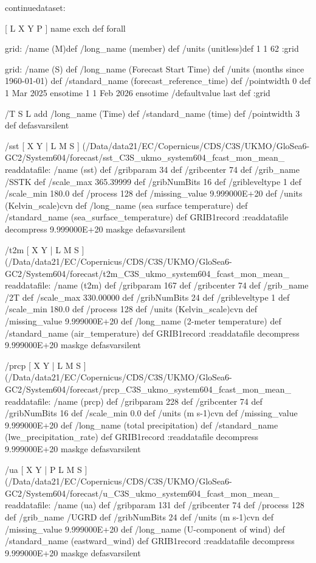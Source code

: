 \begin{ingrid}

continuedataset:

[ L X Y P ] { name exch def } forall

grid:
/name (M)def
/long_name (member) def
/units (unitless)def
1 1 62
:grid

grid:
/name (S) def
/long_name (Forecast Start Time) def
/units (months since 1960-01-01) def
/standard_name (forecast_reference_time) def
/pointwidth 0 def
1 Mar 2025 ensotime
1
1 Feb 2026 ensotime
/defaultvalue { last } def
:grid

/T { S L add
/long_name (Time) def
/standard_name (time) def 
/pointwidth 3 def
} defasvarsilent

/sst { [ X Y | L M S ] (/Data/data21/EC/Copernicus/CDS/C3S/UKMO/GloSea6-GC2/System604/forecast/sst_C3S_ukmo_system604_fcast_mon_mean_%
 readdatafile:
 /name (sst) def
 /gribparam 34 def
 /gribcenter 74 def
 /grib_name /SSTK def
 /scale_max 365.39999 def
 /gribNumBits 16 def
 /gribleveltype 1 def
 /scale_min 180.0 def
 /process 128 def
 /missing_value 9.999000E+20 def
 /units (Kelvin_scale)cvn def
 /long_name (sea surface temperature) def
 /standard_name (sea_surface_temperature) def
 GRIB1record :readdatafile
 decompress
 9.999000E+20 maskge
}defasvarsilent

/t2m { [ X Y | L M S ] (/Data/data21/EC/Copernicus/CDS/C3S/UKMO/GloSea6-GC2/System604/forecast/t2m_C3S_ukmo_system604_fcast_mon_mean_%
 readdatafile:
 /name (t2m) def
 /gribparam 167 def
 /gribcenter 74 def
 /grib_name /2T def
 /scale_max 330.00000 def
 /gribNumBits 24 def
 /gribleveltype 1 def
 /scale_min 180.0 def
 /process 128 def
 /units (Kelvin_scale)cvn def
 /missing_value 9.999000E+20 def
 /long_name (2-meter temperature) def
 /standard_name (air_temperature) def
 GRIB1record :readdatafile
 decompress
 9.999000E+20 maskge
}defasvarsilent

/prcp {
[ X Y | L M S ] (/Data/data21/EC/Copernicus/CDS/C3S/UKMO/GloSea6-GC2/System604/forecast/prcp_C3S_ukmo_system604_fcast_mon_mean_%
 readdatafile:
 /name (prcp) def
 /gribparam 228 def
 /gribcenter 74 def
 /gribNumBits 16 def
 /scale_min 0.0 def
 /units (m s-1)cvn def
 /missing_value 9.999000E+20 def
 /long_name (total precipitation) def
 /standard_name (lwe_precipitation_rate) def
 GRIB1record :readdatafile
 decompress
 9.999000E+20 maskge
}defasvarsilent

/ua {
[ X Y | P L M S ] (/Data/data21/EC/Copernicus/CDS/C3S/UKMO/GloSea6-GC2/System604/forecast/u_C3S_ukmo_system604_fcast_mon_mean_%
 readdatafile:
 /name (ua) def
 /gribparam 131 def
 /gribcenter 74 def
 /process 128 def
 /grib_name /UGRD def
 /gribNumBits 24 def
 /units (m s-1)cvn def
 /missing_value 9.999000E+20 def
 /long_name (U-component of wind) def
 /standard_name (eastward_wind) def
 GRIB1record :readdatafile
 decompress
 9.999000E+20 maskge
} defasvarsilent


\end{ingrid}
